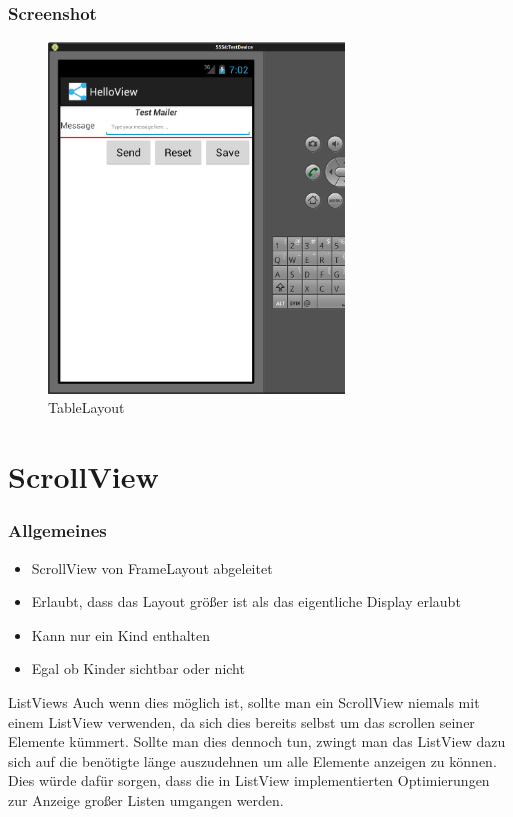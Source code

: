 \begin{frame}
   \frametitle{Screenshot}
   \begin{figure}[h!]
     \centering
     \includegraphics[width=0.7\textwidth]{pictures/table_layout.ps}
     \caption{
        TableLayout
     }
     \label{fig:table_layout}
   \end{figure}
\end{frame}

\section{ScrollView}
\begin{frame}[label=scrollview]
   \frametitle{Allgemeines}
   \begin{itemize}
      \item ScrollView von FrameLayout abgeleitet
      \item Erlaubt, dass das Layout größer ist als das eigentliche Display erlaubt
      \item Kann nur ein Kind enthalten
      \item Egal ob Kinder sichtbar oder nicht
   \end{itemize}

   \begin{alertblock}{ListViews}
		Auch wenn dies möglich ist, sollte man ein ScrollView niemals mit einem ListView 
		verwenden, da sich dies bereits selbst um das scrollen seiner Elemente kümmert. 
		Sollte man dies dennoch tun, zwingt man das ListView dazu sich auf die benötigte 
		länge auszudehnen um alle Elemente anzeigen zu können. Dies würde dafür sorgen, 
		dass die in ListView implementierten Optimierungen zur Anzeige großer Listen 
		umgangen werden.
   \end{alertblock}
\end{frame}

